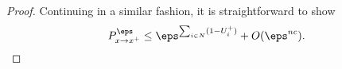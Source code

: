 \begin{proof}
Continuing in a similar fashion, it is straightforward to show 
\begin{equation}\label{e:ub}
P^\eps_{x\to x^+}\leq\eps^{\sum_{i\in N}(1-U_i^+)} + O(\eps^{nc}).
\end{equation}


\end{proof}
